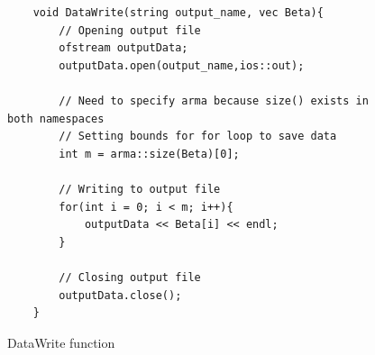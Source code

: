 \documentclass{article}
\begin{document}
\begin{figure}[H]
\begin{lstlisting}
	void DataWrite(string output_name, vec Beta){
		// Opening output file
		ofstream outputData;
		outputData.open(output_name,ios::out);
		
		// Need to specify arma because size() exists in both namespaces
		// Setting bounds for for loop to save data
		int m = arma::size(Beta)[0];
		
		// Writing to output file
		for(int i = 0; i < m; i++){
			outputData << Beta[i] << endl;
		}
		
		// Closing output file
		outputData.close();
	}
\end{lstlisting}
\caption{DataWrite function}\label{fig:DataWrite}
\end{figure}
\end{document}
